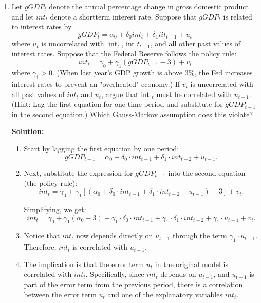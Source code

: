 \documentclass[12pt]{article}
\begin{document}
\begin{enumerate}


\item Let $g G D P_t$ denote the annual percentage change in gross domestic product and let $i n t_t$ denote a shortterm interest rate. Suppose that $g G D P_t$ is related to interest rates by
$$
g G D P_t=\alpha_0+\delta_0 i n t_t+\delta_1 i i t_{t-1}+u_t
$$
where $u_t$ is uncorrelated with $\operatorname{int}_t$, int $t_{t-1}$, and all other past values of interest rates. Suppose that the Federal Reserve follows the policy rule:
$$
i n t_t=\gamma_0+\gamma_1\left(g G D P_{t-1}-3\right)+v_t
$$
where $\gamma_1>0$. (When last year's GDP growth is above $3 \%$, the Fed increases interest rates to prevent an "overheated" economy.) If $v_t$ is uncorrelated with all past values of $i n t_t$ and $u_t$, argue that int $_t$ must be correlated with $u_{t-1}$. (Hint: Lag the first equation for one time period and substitute for $g G D P_{t-1}$ in the second equation.) Which Gauss-Markov assumption does this violate?


{\color{blue}
\noindent \textbf{Solution:}

\begin{enumerate}

        \item Start by lagging the first equation by one period:
        \[
        gGDP_{t-1} = \alpha_0 + \delta_0 \cdot int_{t-1} + \delta_1 \cdot int_{t-2} + u_{t-1}.
        \]
        
        \item Next, substitute the expression for \( gGDP_{t-1} \) into the second equation (the policy rule):
        \[
        int_t = \gamma_0 + \gamma_1 \left[\left(\alpha_0 + \delta_0 \cdot int_{t-1} + \delta_1 \cdot int_{t-2} + u_{t-1}\right) - 3\right] + v_t.
        \]
        
        Simplifying, we get:
        \[
        int_t = \gamma_0 + \gamma_1 \left(\alpha_0 - 3\right) + \gamma_1 \cdot \delta_0 \cdot int_{t-1} + \gamma_1 \cdot \delta_1 \cdot int_{t-2} + \gamma_1 \cdot u_{t-1} + v_t.
        \]
        
        \item Notice that \( int_t \) now depends directly on \( u_{t-1} \) through the term \( \gamma_1 \cdot u_{t-1} \). Therefore, \( int_t \) is correlated with \( u_{t-1} \).
        
        \item The implication is that the error term \( u_t \) in the original model is correlated with \( int_t \). Specifically, since \( int_t \) depends on \( u_{t-1} \), and \( u_{t-1} \) is part of the error term from the previous period, there is a correlation between the error term \( u_t \) and one of the explanatory variables \( int_t \).


\end{enumerate}}
\end{enumerate}
\end{document}
